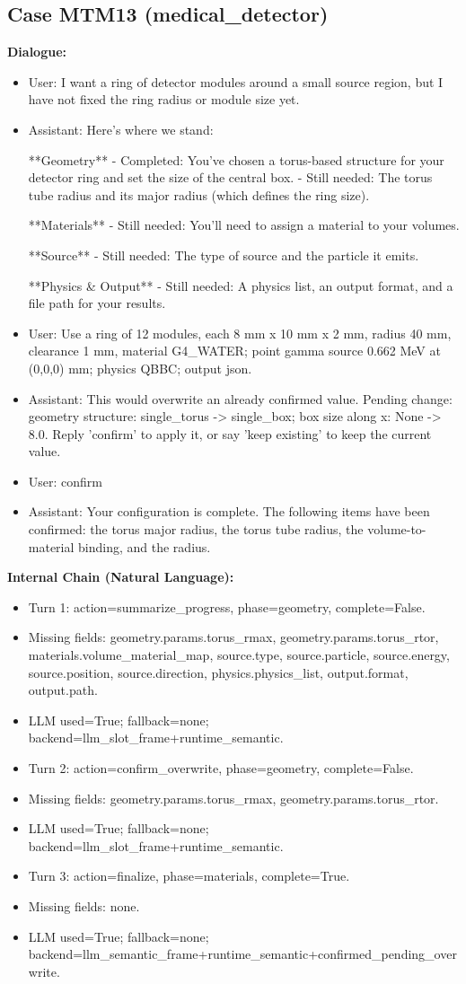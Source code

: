 \documentclass[11pt]{ctexart}
\begin{document}
\subsection{Case MTM13 (medical\_detector)}
\textbf{Dialogue:}
\begin{itemize}
\item User: I want a ring of detector modules around a small source region, but I have not fixed the ring radius or module size yet.
\item Assistant: Here's where we stand:

**Geometry**
- Completed: You've chosen a torus-based structure for your detector ring and set the size of the central box.
- Still needed: The torus tube radius and its major radius (which defines the ring size).

**Materials**
- Still needed: You'll need to assign a material to your volumes.

**Source**
- Still needed: The type of source and the particle it emits.

**Physics \& Output**
- Still needed: A physics list, an output format, and a file path for your results.
\item User: Use a ring of 12 modules, each 8 mm x 10 mm x 2 mm, radius 40 mm, clearance 1 mm, material G4\_WATER; point gamma source 0.662 MeV at (0,0,0) mm; physics QBBC; output json.
\item Assistant: This would overwrite an already confirmed value. Pending change: geometry structure: single\_torus -> single\_box; box size along x: None -> 8.0. Reply 'confirm' to apply it, or say 'keep existing' to keep the current value.
\item User: confirm
\item Assistant: Your configuration is complete. The following items have been confirmed: the torus major radius, the torus tube radius, the volume-to-material binding, and the radius.
\end{itemize}
\textbf{Internal Chain (Natural Language):}
\begin{itemize}
\item Turn 1: action=summarize\_progress, phase=geometry, complete=False.
\item Missing fields: geometry.params.torus\_rmax, geometry.params.torus\_rtor, materials.volume\_material\_map, source.type, source.particle, source.energy, source.position, source.direction, physics.physics\_list, output.format, output.path.
\item LLM used=True; fallback=none; backend=llm\_slot\_frame+runtime\_semantic.
\item Turn 2: action=confirm\_overwrite, phase=geometry, complete=False.
\item Missing fields: geometry.params.torus\_rmax, geometry.params.torus\_rtor.
\item LLM used=True; fallback=none; backend=llm\_slot\_frame+runtime\_semantic.
\item Turn 3: action=finalize, phase=materials, complete=True.
\item Missing fields: none.
\item LLM used=True; fallback=none; backend=llm\_semantic\_frame+runtime\_semantic+confirmed\_pending\_overwrite.
\end{itemize}
\end{document}
